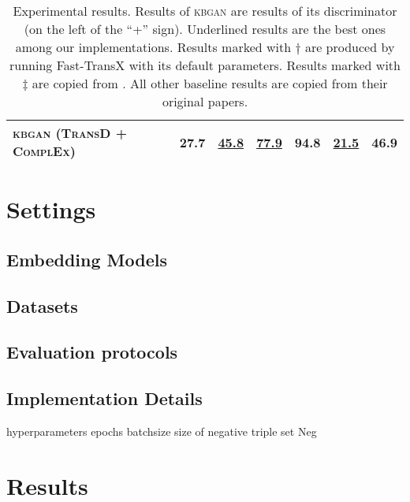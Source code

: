 \begin{table*}[t]
\begin{tabular}{|l|cc|cc|cc|}
\textsc{kbgan} (\textsc{TransD} + \textsc{ComplEx})   & 27.7 & \textbf{\underline{45.8}} & \underline{77.9} & 94.8 & \underline{21.5} & 46.9\\ \hline
\end{tabular}
\caption{Experimental results. Results of \textsc{kbgan} are results of its discriminator (on the left of the ``+'' sign). Underlined results are the best ones among our implementations. Results marked with $\dag$ are produced by running Fast-TransX \cite{lin2015learning} with its default parameters. Results marked with $\ddag$ are copied from \cite{conve}. All other baseline results are copied from their original papers.}
\label{tab:results}
\end{table*}





\section{Settings}
\subsection{Embedding Models}
\subsection{Datasets}
\subsection{Evaluation protocols}

\subsection{Implementation Details}
hyperparameters
epochs
batchsize
size of negative triple set Neg
\section{Results}